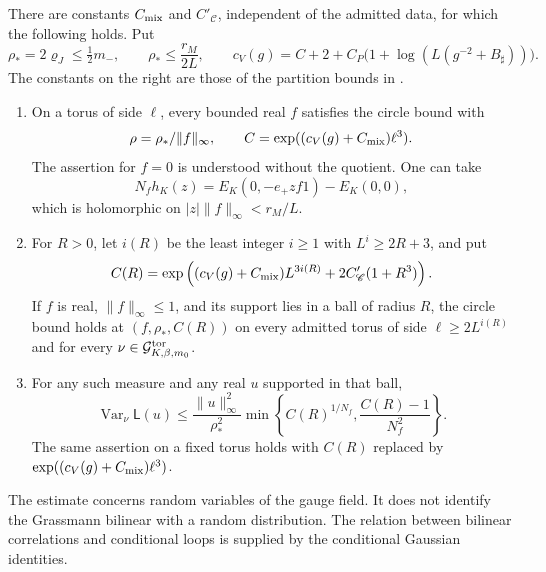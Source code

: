 \documentclass[11pt,letterpaper,reqno]{amsart}
\makeatletter
\theoremstyle{definition}
\newcommand{\ms@majorstart}{%
  \pushQED{\qed}\renewcommand{\qedsymbol}{$\blacksquare\square$}}
\newenvironment{theorem}[1][]{\ms@majorstart\ms@theorem[#1]}
  {\popQED\endms@theorem}
\theoremstyle{remark}
\makeatother
\begin{document}
\begin{theorem}[Circle bound]\label{C-415-17}
There are constants $C_{\rm mix}$ and $C'_{\mathscr C}$, independent
of the admitted data, for which the following holds.  Put
\[
 \rho_*=2\varrho_J\le\tfrac12{m_-} ,\qquad
 \rho_*\le\frac{r_M}{2L},\qquad
 c_V(g)=C+2+C_P\bigl(1+\log(L(g^{-2}+B_\sharp))\bigr).
\]
The constants on the right are those of the partition bounds in
\cite[Props. 10.14 and 10.17]{QCDM1}.
\begin{enumerate}
\item On a torus of side $\ell$, every bounded real $f$ satisfies
the circle bound with
\[
 \rho=\rho_*/\|f\|_\infty,
 \qquad C=\exp((c_V(g)+C_{\rm mix})\ell^3).
\]
The assertion for $f=0$ is understood without the quotient.
One can take
\begin{equation}\label{eq:qcdm2-pure-energy}
 N_fh_K(z)=E_K(0,-e_+zf1)-E_K(0,0),
\end{equation}
which is holomorphic on $|z|\|f\|_\infty<r_M/L$.

\item For $R>0$, let $i(R)$ be the least integer $i\ge1$ with
$L^i\ge2R+3$, and put
\begin{equation}\label{eq:qcdm2-CR}
 C(R)=\exp\left((c_V(g)+C_{\rm mix})L^{3i(R)}
                 +2C'_{\mathscr C}(1+R^3)\right).
\end{equation}
If $f$ is real, $\|f\|_\infty\le1$, and its support lies in a ball
of radius $R$, the circle bound holds at $(f,\rho_*,C(R))$ on
every admitted torus of side $\ell\ge2L^{i(R)}$ and for every
$\nu\in\mathcal G^{\rm tor}_{K,\beta,m_0}$.

\item For any such measure and any real $u$ supported in that ball,
\begin{equation}\label{eq:qcdm2-loop-variance}
 \operatorname{Var}_\nu\mathsf L(u)
 \le \frac{\|u\|_\infty^2}{\rho_*^2}
       \min\left\{C(R)^{1/N_f},\frac{C(R)-1}{N_f^2}\right\}.
\end{equation}
The same assertion on a fixed torus holds with
$C(R)$ replaced by $\exp((c_V(g)+C_{\rm mix})\ell^3)$.
\end{enumerate}
\end{theorem}

The estimate concerns random variables of the gauge field.  It does
not identify the Grassmann bilinear with a random distribution.
The relation between bilinear correlations and conditional loops
is supplied by the conditional Gaussian identities.
\end{document}
